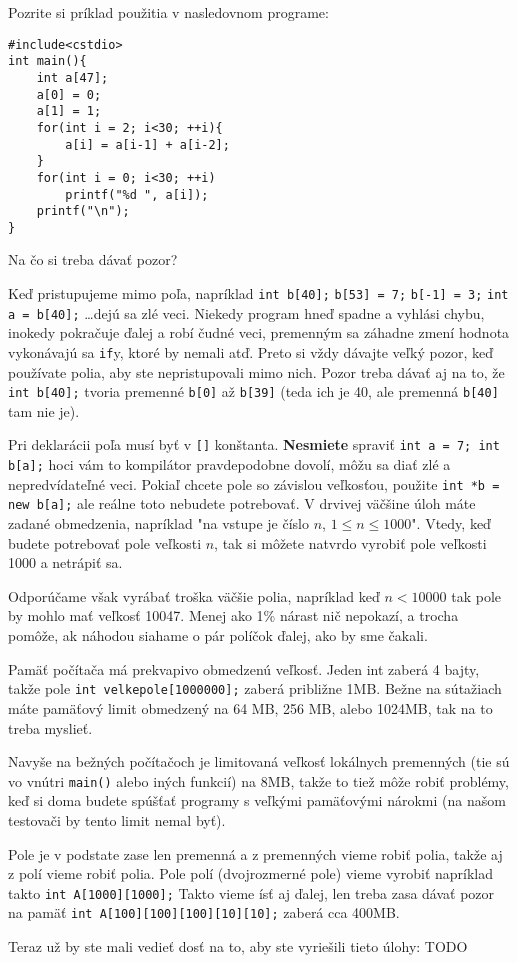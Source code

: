 Pozrite si príklad použitia v nasledovnom programe:
\begin{lstlisting}
#include<cstdio>
int main(){
    int a[47];
    a[0] = 0;
    a[1] = 1;
    for(int i = 2; i<30; ++i){
        a[i] = a[i-1] + a[i-2];
    }
    for(int i = 0; i<30; ++i)
        printf("%d ", a[i]);
    printf("\n");
}
\end{lstlisting}

Na čo si treba dávať pozor?

Keď pristupujeme mimo poľa, napríklad \verb!int b[40];! \verb!b[53] = 7;!
\verb!b[-1] = 3;! \verb!int a = b[40];! \dots dejú sa zlé veci. Niekedy program
hneď spadne a vyhlási chybu, inokedy pokračuje ďalej a robí čudné veci,
premenným sa záhadne zmení hodnota vykonávajú sa \verb!if!y, ktoré by nemali
atď.  Preto si vždy dávajte veľký pozor, keď používate polia, aby ste
nepristupovali mimo nich.  Pozor treba dávať aj na to, že \verb!int b[40];!
tvoria premenné \verb!b[0]! až \verb!b[39]!  (teda ich je 40, ale premenná
\verb!b[40]! tam nie je).

Pri deklarácii poľa musí byť v \verb![]! konštanta.  \textbf{Nesmiete} spraviť
\verb!int a = 7; int b[a];! hoci vám to kompilátor pravdepodobne dovolí, môžu
sa diať zlé a nepredvídateľné veci.  Pokiaľ chcete pole so závislou veľkosťou,
použite \verb!int *b = new b[a];! ale reálne toto nebudete potrebovať. V
drvivej väčšine úloh máte zadané obmedzenia, napríklad "na vstupe je číslo $n$,
$1\leq n\leq 1000$". Vtedy, keď budete potrebovať pole veľkosti $n$, tak si
môžete natvrdo vyrobiť pole veľkosti 1000 a netrápiť sa.

Odporúčame však vyrábať troška väčšie polia, napríklad keď $n<10000$ tak pole
by mohlo mať veľkosť 10047. Menej ako 1\% nárast nič nepokazí, a trocha pomôže,
ak náhodou siahame o pár políčok ďalej, ako by sme čakali. 

Pamäť počítača má prekvapivo obmedzenú veľkosť. Jeden int zaberá 4 bajty, takže
pole \verb!int velkepole[1000000];! zaberá približne 1MB. Bežne na sútažiach
máte pamäťový limit obmedzený na 64 MB, 256 MB, alebo 1024MB, tak na to treba
myslieť.

Navyše na bežných počítačoch je limitovaná veľkosť lokálnych premenných (tie sú
vo vnútri \verb!main()! alebo iných funkcií) na 8MB, takže to tiež môže robiť
problémy, keď si doma budete spúšťať programy s veľkými pamäťovými nárokmi (na
našom testovači by tento limit nemal byť).

\medskip

Pole je v podstate zase len premenná a z premenných vieme robiť polia, takže aj
z polí vieme robiť polia. Pole polí (dvojrozmerné pole) vieme vyrobiť napríklad
takto \verb!int A[1000][1000];! Takto vieme ísť aj ďalej, len treba zasa dávať
pozor na pamäť \verb!int A[100][100][100][10][10];! zaberá cca 400MB.


Teraz už by ste mali vedieť dosť na to, aby ste vyriešili tieto úlohy: TODO %





